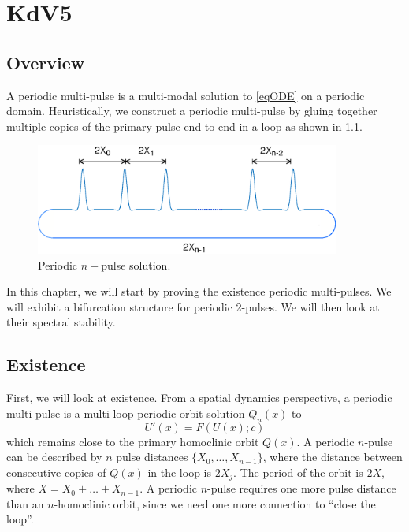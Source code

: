 \documentclass[thesis.tex]{subfiles}
\begin{document}
\iffulldocument\else
	\chapter{KdV5}
\fi

\section{Overview}

A periodic multi-pulse is a multi-modal solution to \cref{eqODE} on a periodic domain. Heuristically, we construct a periodic multi-pulse by gluing together multiple copies of the primary pulse end-to-end in a loop as shown in \cref{fig:permultipulse}.
\begin{figure}
\includegraphics[width=10cm]{periodic/multipulseperiodic}
\caption{Periodic $n-$pulse solution.}
\label{fig:permultipulse}
\end{figure}

In this chapter, we will start by proving the existence periodic multi-pulses. We will exhibit a bifurcation structure for periodic 2-pulses. We will then look at their spectral stability.

\section{Existence}

First, we will look at existence. From a spatial dynamics perspective, a periodic multi-pulse is a multi-loop periodic orbit solution $Q_n(x)$ to
\begin{equation}\label{existgenODE}
U'(x) = F(U(x); c)
\end{equation}
which remains close to the primary homoclinic orbit $Q(x)$. A periodic $n$-pulse can be described by $n$ pulse distances $\{X_0, \dots, X_{n-1} \}$, where the distance between consecutive copies of $Q(x)$ in the loop is $2 X_j$. The period of the orbit is $2X$, where $X = X_0 + \dots + X_{n-1}$. A periodic $n$-pulse requires one more pulse distance than an $n$-homoclinic orbit, since we need one more connection to ``close the loop''.  
\end{document}
